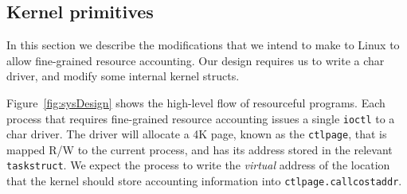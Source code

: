 \documentclass[12pt]{article}
\def\_{\textunderscore\-}
\begin{document}
%
%
%

  \subsection{Kernel primitives}\label{kernelprimitives}

  In this section we describe the modifications that we intend to make to Linux to allow fine-grained resource accounting. Our design requires us to write a char driver, and modify some internal kernel structs.

  Figure~\ref{fig:sysDesign} shows the high-level flow of resourceful programs. Each process that requires fine-grained resource accounting issues a single \texttt{ioctl} to a char driver. The driver will allocate a 4K page, known as the \texttt{ctl\_page}, that is mapped R/W to the current process, and has its address stored in the relevant \texttt{task\_struct}. We expect the process to write the \emph{virtual} address of the location that the kernel should store accounting information into \texttt{ctl\_page.call\_cost\_addr}.
\end{document}
